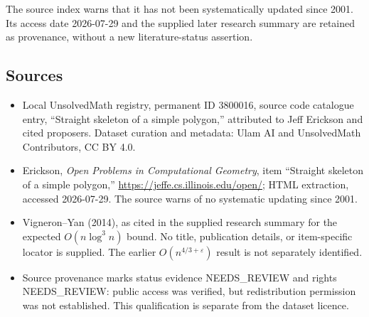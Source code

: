 \documentclass[11pt]{article}
\begin{document}
The source index warns that it has not been systematically updated since 2001. Its access date 2026-07-29 and the supplied later research summary are retained as provenance, without a new literature-status assertion.
\subsection{Sources}
\begin{itemize}
\item Local UnsolvedMath registry, permanent ID 3800016, source code catalogue entry, ``Straight skeleton of a simple polygon,'' attributed to Jeff Erickson and cited proposers. Dataset curation and metadata: Ulam AI and UnsolvedMath Contributors, CC BY 4.0.
\item Erickson, \emph{Open Problems in Computational Geometry}, item ``Straight skeleton of a simple polygon,'' \url{https://jeffe.cs.illinois.edu/open/}; HTML extraction, accessed 2026-07-29. The source warns of no systematic updating since 2001.
\item Vigneron--Yan (2014), as cited in the supplied research summary for the expected $O(n\log^3n)$ bound. No title, publication details, or item-specific locator is supplied. The earlier $O(n^{4/3+\varepsilon})$ result is not separately identified.
\item Source provenance marks status evidence NEEDS\_REVIEW and rights NEEDS\_REVIEW: public access was verified, but redistribution permission was not established. This qualification is separate from the dataset licence.
\end{itemize}
\end{document}
